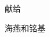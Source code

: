 
\thispagestyle{empty}

\begin{center}
献给

海燕和铭基
\end{center}

\setlength{\abovedisplayskip}{-5pt}
\setlength{\abovedisplayshortskip}{-5pt}
